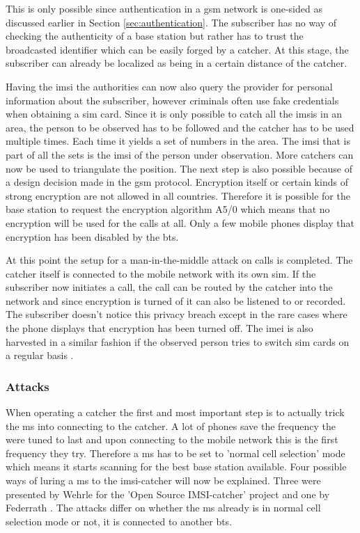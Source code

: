 This is only possible since authentication in a \gls{gsm} network is one-sided as discussed earlier in Section \ref{sec:authentication}.
The subscriber has no way of checking the authenticity of a base station but rather has to trust the broadcasted identifier which can be easily forged by a catcher.
At this stage, the subscriber can already be localized as being in a certain distance of the catcher.

Having the \gls{imsi} the authorities can now also query the provider for personal information about the subscriber, however criminals often use fake credentials when obtaining a \gls{sim} card.
Since it is only possible to catch all the \glspl{imsi} in an area, the person to be observed has to be followed and the catcher has to be used multiple times.
Each time it yields a set of numbers in the area. 
The \gls{imsi} that is part of all the sets is the \gls{imsi} of the person under observation.
More catchers can now be used to triangulate the position.
The next step is also possible because of a design decision made in the \gls{gsm} protocol.
Encryption itself or certain kinds of strong encryption are not allowed in all countries.
Therefore it is possible for the base station to request the encryption algorithm A5/0 which means that no encryption will be used for the calls at all.
Only a few mobile phones display that encryption has been disabled by the \gls{bts}.

At this point the setup for a man-in-the-middle attack \cite{mueller} on calls is completed.
The catcher itself is connected to the mobile network with its own \gls{sim}.
If the subscriber now initiates a call, the call can be routed by the catcher into the network and since encryption is turned of it can also be listened to or recorded.
The subscriber doesn't notice this privacy breach except in the rare cases where the phone displays that encryption has been turned off.
The \gls{imei} is also harvested in a similar fashion if the observed person tries to switch \gls{sim} cards on a regular basis \cite{fox}.

\subsubsection{Attacks}
\label{sec:attacks}
When operating a catcher the first and most important step is to actually trick the \gls{ms} into connecting to the catcher.
A lot of phones save the frequency the were tuned to last and upon connecting to the mobile network this is the first frequency they try.
Therefore a \gls{ms} has to be set to 'normal cell selection' mode which means it starts scanning for the best base station available.
Four possible ways of luring a \gls{ms} to the \gls{imsi}-catcher will now be explained.
Three were presented by Wehrle for the 'Open Source IMSI-catcher' project \cite{dennis} and one by Federrath \cite{mueller}.
The attacks differ on whether the \gls{ms} already is in normal cell selection mode or not, \ie it is connected to another \gls{bts}.

